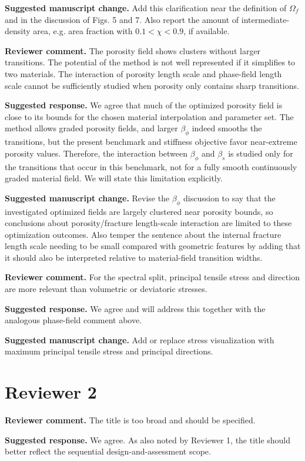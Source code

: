\documentclass[11pt,a4paper]{article}
\newcommand{\comment}[1]{\par\noindent\textbf{Reviewer comment.} #1\par}
\newcommand{\response}[1]{\par\noindent\textbf{Suggested response.} #1\par}
\newcommand{\change}[1]{\par\noindent\textbf{Suggested manuscript change.} #1\par}
\begin{document}
\change{Add this clarification near the definition of \(\Omega_f\) and in the
discussion of Figs. 5 and 7. Also report the amount of intermediate-density
area, e.g. area fraction with \(0.1<\chi<0.9\), if available.}

\comment{The porosity field shows clusters without larger transitions. The
potential of the method is not well represented if it simplifies to two
materials. The interaction of porosity length scale and phase-field length
scale cannot be sufficiently studied when porosity only contains sharp
transitions.}

\response{We agree that much of the optimized porosity field is close to its
bounds for the chosen material interpolation and parameter set. The method
allows graded porosity fields, and larger \(\beta_\phi\) indeed smooths the
transitions, but the present benchmark and stiffness objective favor
near-extreme porosity values. Therefore, the interaction between
\(\beta_\phi\) and \(\beta_s\) is studied only for the transitions that occur
in this benchmark, not for a fully smooth continuously graded material field.
We will state this limitation explicitly.}

\change{Revise the \(\beta_\phi\) discussion to say that the investigated
optimized fields are largely clustered near porosity bounds, so conclusions
about porosity/fracture length-scale interaction are limited to these
optimization outcomes. Also temper the sentence about the internal fracture
length scale needing to be small compared with geometric features by adding
that it should also be interpreted relative to material-field transition
widths.}

\comment{For the spectral split, principal tensile stress and direction are
more relevant than volumetric or deviatoric stresses.}

\response{We agree and will address this together with the analogous
phase-field comment above.}

\change{Add or replace stress visualization with maximum principal tensile
stress and principal directions.}

\section*{Reviewer 2}

\comment{The title is too broad and should be specified.}

\response{We agree. As also noted by Reviewer 1, the title should better
reflect the sequential design-and-assessment scope.}
\end{document}
